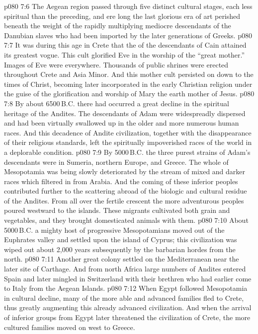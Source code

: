 \vs p080 7:6 The Aegean region passed through five distinct cultural stages, each less spiritual than the preceding, and ere long the last glorious era of art perished beneath the weight of the rapidly multiplying mediocre descendants of the Danubian slaves who had been imported by the later generations of Greeks.
\vs p080 7:7 It was during this age in Crete that the  of the descendants of Cain attained its greatest vogue. This cult glorified Eve in the worship of the “great mother.” Images of Eve were everywhere. Thousands of public shrines were erected throughout Crete and Asia Minor. And this mother cult persisted on down to the times of Christ, becoming later incorporated in the early Christian religion under the guise of the glorification and worship of Mary the earth mother of Jesus.
\vs p080 7:8 \pc By about 6500\,B.C. there had occurred a great decline in the spiritual heritage of the Andites. The descendants of Adam were widespreadly dispersed and had been virtually swallowed up in the older and more numerous human races. And this decadence of Andite civilization, together with the disappearance of their religious standards, left the spiritually impoverished races of the world in a deplorable condition.
\vs p080 7:9 \pc By 5000\,B.C. the three purest strains of Adam’s descendants were in Sumeria, northern Europe, and Greece. The whole of Mesopotamia was being slowly deteriorated by the stream of mixed and darker races which filtered in from Arabia. And the coming of these inferior peoples contributed further to the scattering abroad of the biologic and cultural residue of the Andites. From all over the fertile crescent the more adventurous peoples poured westward to the islands. These migrants cultivated both grain and vegetables, and they brought domesticated animals with them.
\vs p080 7:10 About 5000\,B.C. a mighty host of progressive Mesopotamians moved out of the Euphrates valley and settled upon the island of Cyprus; this civilization was wiped out about 2,000 years subsequently by the barbarian hordes from the north.
\vs p080 7:11 \pc Another great colony settled on the Mediterranean near the later site of Carthage. And from north Africa large numbers of Andites entered Spain and later mingled in Switzerland with their brethren who had earlier come to Italy from the Aegean Islands.
\vs p080 7:12 \pc When Egypt followed Mesopotamia in cultural decline, many of the more able and advanced families fled to Crete, thus greatly augmenting this already advanced civilization. And when the arrival of inferior groups from Egypt later threatened the civilization of Crete, the more cultured families moved on west to Greece.
